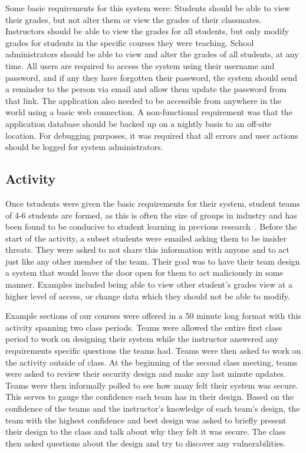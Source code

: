 \documentclass[conference]{IEEEtran}
\begin{document}
Some basic requirements for this system were: Students should be able to view their grades, but not alter them or view the grades of their classmates. Instructors should be able to view the grades for all students, but only modify grades for students in the specific courses they were teaching. School administrators should be able to view and alter the grades of all students, at any time. All users are required to access the system using their username and password, and if any they have forgotten their password, the system should send a reminder to the person via email and allow them update the password from that link. The application also needed to be accessible from anywhere in the world using a basic web connection. A non-functional requirement was that the application database should be backed up on a nightly basis to an off-site location. For debugging purposes, it was required that all errors and user actions should be logged for system administrators.

\subsection{Activity}

Once tstudents were given the basic requirements for their system, student teams of 4-6 students are formed, as this is often the size of groups in industry and has been found to be conducive to student learning in previous research~\cite{Guo:2009:GPS:1516546.1516579, Petkovic:2006:TPS:1140123.1140202}. Before the start of the activity, a subset students were emailed asking them to be insider threats. They were asked to not share this information with anyone and to act just like any other member of the team. Their goal was to have their team design a system that would leave the door open for them to act maliciously in some manner. Examples included being able to view other student's grades view at a higher level of access, or change data which they should not be able to modify.

Example sections of our courses were offered in a 50 minute long format with this activity spanning two class periods. Teams were allowed the entire first class period to work on designing their system while the instructor answered any requirements specific questions the teams had. Teams were then asked to work on the activity outside of class. At the beginning of the second class meeting, teams were asked to review their security design and make any last minute updates. Teams were then informally polled to see how many felt their system was secure. This serves to gauge the confidence each team has in their design. Based on the confidence of the teams and the instructor's knowledge of each team's design, the team with the highest confidence and best design was asked to briefly present their design to the class and talk about why they felt it was secure. The class then asked questions about the design and try to discover any vulnerabilities.
\end{document}
